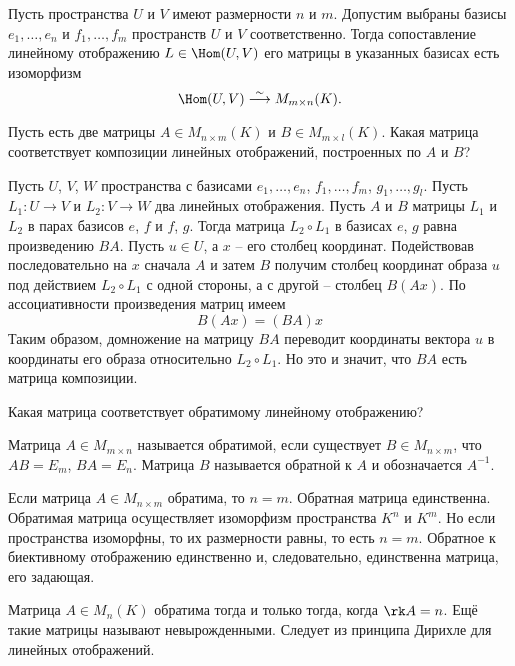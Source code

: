 \crl Пусть пространства $U$ и $V$ имеют размерности $n$ и $m$. Допустим выбраны базисы $e_1,\dots,e_n$ и $f_1,\dots,f_m$ пространств $U$ и $V$ соответственно. Тогда сопоставление линейному отображению $L \in \Hom(U,V)$ его матрицы в указанных базисах есть изоморфизм
$$\Hom(U,V) \stackrel{\sim}{\longrightarrow} M_{m\times n}(K).$$
\ecrl





Пусть есть две матрицы $A\in M_{n\times m}(K)$ и $B\in M_{m\times l}(K)$. Какая матрица соответствует композиции линейных отображений, построенных по $A$ и $B$?



\thrm Пусть $U$, $V$, $W$ пространства с базисами $e_1,\dots,e_n$, $f_1,\dots,f_m$, $g_1,\dots,g_l$. Пусть $L_1\colon U \to V$ и $L_2\colon V \to W$ два линейных отображения. Пусть $A$ и $B$ матрицы $L_1$ и $L_2$ в парах базисов $e$, $f$  и $f$, $g$. Тогда матрица $L_2 \circ L_1$ в базисах $e$, $g$ равна произведению $BA$.
\ethrm
\proof Пусть $u\in U$, а $x$ -- его столбец координат. Подействовав последовательно на $x$ сначала $A$ и затем $B$ получим столбец координат образа $u$ под действием $L_2\circ L_1$ с одной стороны, а с другой -- столбец $B(Ax)$.  По ассоциативности произведения матриц имеем $$B(Ax)=(BA)x$$
Таким образом, домножение на матрицу $BA$ переводит координаты вектора $u$ в координаты его образа относительно $L_2 \circ L_1$. Но это и значит, что $BA$ есть матрица композиции.
\endproof




Какая матрица соответствует обратимому линейному отображению? 



\dfn Матрица $A \in M_{m\times n}$ называется обратимой, если существует $B \in M_{n\times m}$, что $AB=E_m$, $BA=E_n$.  Матрица $B$ называется обратной к $A$ и обозначается $A^{-1}$.
\edfn

\crl Если матрица $A \in M_{n\times m}$ обратима, то $n=m$. Обратная матрица единственна.
\proof Обратимая матрица осуществляет изоморфизм пространства $K^n$ и $K^m$.  Но если пространства изоморфны, то их размерности равны, то есть $n=m$. Обратное к биективному отображению единственно и, следовательно, единственна матрица, его задающая.
\endproof
\ecrl


\crl Матрица $A \in M_n(K)$  обратима тогда и только тогда, когда $\rk A=n$. Ещё такие матрицы называют невырожденными.
\ecrl
\proof Следует из принципа Дирихле для линейных отображений.
\endproof

